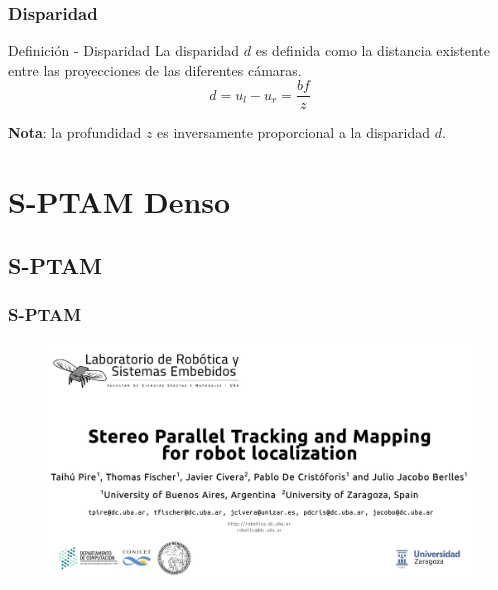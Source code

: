 \documentclass[compress]{beamer}
\begin{document}
\begin{frame}
\frametitle{Disparidad}


\begin{block}{Definición - Disparidad}
La disparidad $d$ es definida como la distancia existente entre las proyecciones de las diferentes cámaras.
\begin{equation}
d=u_{l}-u_{r}=\frac{bf}{z}
\end{equation}
\end{block}

\textbf{Nota}: la profundidad $z$ es inversamente proporcional a la disparidad $d$.

\end{frame}


\section{S-PTAM Denso}


\subsection{S-PTAM}


\begin{frame}
	\frametitle{S-PTAM}
	\begin{figure}[htb]
		\centering
		\includegraphics[width=1.0\columnwidth]{method/portada-sptam-kitti-video.pdf}
		\hfill
	\end{figure}

\end{frame}
\end{document}
